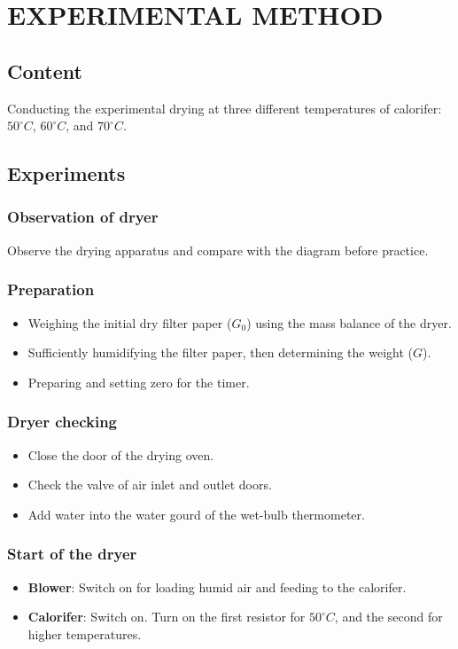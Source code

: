 \section{EXPERIMENTAL METHOD}
\subsection{Content}
Conducting the experimental drying at three different temperatures of calorifer: $50^\circ C$, $60^\circ C$, and $70^\circ C$.

\subsection{Experiments}
\subsubsection{Observation of dryer}
Observe the drying apparatus and compare with the diagram before practice.

\subsubsection{Preparation}
\begin{itemize}
    \item Weighing the initial dry filter paper ($G_0$) using the mass balance of the dryer.
    \item Sufficiently humidifying the filter paper, then determining the weight ($G$).
    \item Preparing and setting zero for the timer.
\end{itemize}

\subsubsection{Dryer checking}
\begin{itemize}
    \item Close the door of the drying oven.
    \item Check the valve of air inlet and outlet doors.
    \item Add water into the water gourd of the wet-bulb thermometer.
\end{itemize}

\subsubsection{Start of the dryer}
\begin{itemize}
    \item \textbf{Blower}: Switch on for loading humid air and feeding to the calorifer.
    \item \textbf{Calorifer}: Switch on. Turn on the first resistor for $50^\circ C$, and the second for higher temperatures.
\end{itemize}

